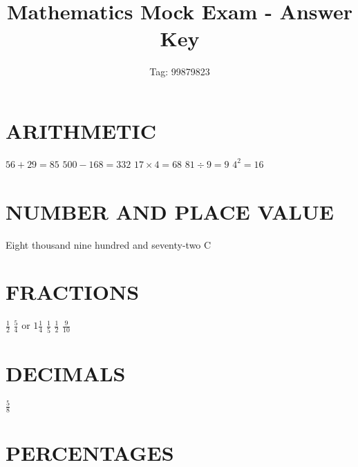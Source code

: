 \documentclass{exam}
\begin{document}
\title{Mathematics Mock Exam - Answer Key}
\date{Tag: 99879823}
\maketitle

\section{ARITHMETIC}
\begin{questions}
\question $56 + 29 = 85$
\question $500 - 168 = 332$
\question $17 \times 4 = 68$
\question $81 \div 9 = 9$
\question $4^2 = 16$
\end{questions}

\section{NUMBER AND PLACE VALUE}
\begin{questions}
\question Eight thousand nine hundred and seventy-two
\question C
\end{questions}

\section{FRACTIONS}
\begin{questions}
\question $\frac{1}{2}$
\question $\frac{5}{4}$ or $1 \frac{1}{4}$
\question $\frac{1}{5}$
\question $\frac{1}{2}$
\question $\frac{9}{10}$
\end{questions}

\section{DECIMALS}
\begin{questions}
\question $\frac{5}{8}$
\end{questions}

\section{PERCENTAGES}
\begin{questions}
\question $\frac{11}{20}$
\%
\end{questions}

\section{MEASUREMENT AND GEOMETRY}
\begin{questions}
 cm$^2$
 cm
 cm$^3$
 cm$^2$
 cm
\end{questions}
\end{document}
